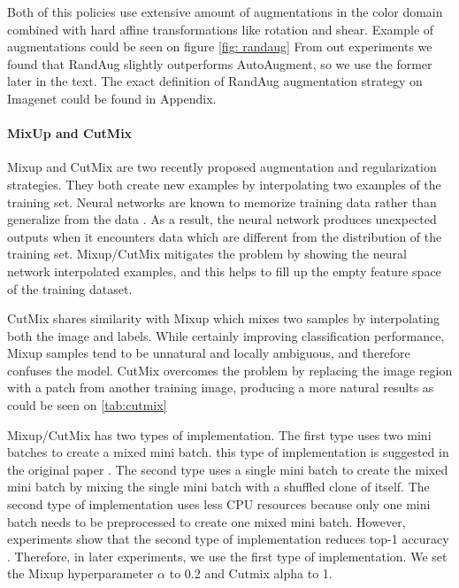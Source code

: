 Both of this policies use extensive amount of augmentations in the color domain combined with hard affine transformations like rotation and shear. Example of augmentations could be seen on figure \ref{fig: randaug}
From out experiments we found that RandAug slightly outperforms AutoAugment, so we use the former later in the text. The exact definition of RandAug augmentation strategy on Imagenet could be found in Appendix. 


\paragraph{MixUp and CutMix}


Mixup \cite{zhang2017_mixup} and CutMix \cite{yun2019_cutmix} are two recently proposed augmentation and regularization strategies. They both create new examples by interpolating two examples of the training set. Neural networks are known to memorize training data rather than generalize from the data \cite{zhang2016_understanding_deep}. As a result, the neural network produces unexpected outputs when it encounters data which are different from the distribution of the training set. Mixup/CutMix mitigates the problem by showing the neural network interpolated examples, and this helps to fill up the empty feature space of the training dataset.



CutMix shares similarity with Mixup which mixes two samples by interpolating both the image and labels. While certainly improving classification performance, Mixup samples tend to be unnatural and locally ambiguous, and therefore confuses the model. CutMix overcomes the problem by replacing the image region with a patch from another training image, producing a more natural results as could be seen on \ref{tab:cutmix}

Mixup/CutMix has two types of implementation. The first type uses two mini batches to create a mixed mini batch. this type of implementation is suggested in the original paper \cite{zhang2017_mixup}. The second type uses a single mini batch to create the mixed mini batch by mixing the single mini batch with a shuffled clone of itself. The second type of implementation uses less CPU resources because only one mini batch needs to be preprocessed to create one mixed mini batch. However, experiments show that the second type of implementation reduces top-1 accuracy \cite{lee2020_compounding_improvements}. Therefore, in later experiments, we use the first type of implementation. We set the Mixup hyperparameter $\alpha$ to 0.2 and Cutmix alpha to 1. 


